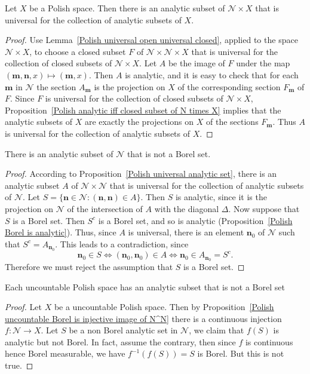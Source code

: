 \begin{proposition}\label{Polish universal analytic set}
Let $X$ be a Polish space. Then there is an analytic subset of $\mathscr{N}\times X$ that is universal for the collection of analytic subsets of $X$.
\end{proposition}
\begin{proof}
Use Lemma~\ref{Polish universal open universal closed}, applied to the space $\mathscr{N}\times X$, to choose a closed subset $F$ of $\mathscr{N}\times\mathscr{N}\times X$ that is universal for the collection of closed subsets of $\mathscr{N}\times X$. Let $A$ be the image of $F$ under the map $(\mathbf{m},\mathbf{n},x)\mapsto(\mathbf{m},x)$. Then $A$ is analytic, and it is easy to check that for each $\mathbf{m}$ in $\mathscr{N}$ the section $A_{\mathbf{m}}$ is the projection on $X$ of the corresponding section $F_{\mathbf{m}}$ of $F$. Since $F$ is universal for the collection of closed subsets of $\mathscr{N}\times X$, Proposition~\ref{Polish analytic iff closed subset of N times X} implies that the analytic subsets of $X$ are exactly the projections on $X$ of the sections $F_{\mathbf{m}}$. Thus $A$ is universal for the collection of analytic subsets of $X$.
\end{proof}
\begin{corollary}\label{analytic nonBorel in N^N}
There is an analytic subset of $\mathscr{N}$ that is not a Borel set.
\end{corollary}
\begin{proof}
According to Proposition~\ref{Polish universal analytic set}, there is an analytic subset $A$ of $\mathscr{N}\times\mathscr{N}$ that is universal for the collection of analytic subsets of $\mathscr{N}$. Let $S=\{\mathbf{n}\in\mathscr{N}:(\mathbf{n},\mathbf{n})\in A\}$. Then $S$ is analytic, since it is the projection on $\mathscr{N}$ of the intersection of $A$ with the diagonal $\Delta$. Now suppose that $S$ is a Borel set. Then $S^c$ is a Borel set, and so is analytic (Proposition~\ref{Polish Borel is analytic}). Thus, since $A$ is universal, there is an element $\mathbf{n}_0$ of $\mathscr{N}$ such that $S^c=A_{\mathbf{n}_0}$. This leads to a contradiction, since
\[\mathbf{n}_0\in S\iff(\mathbf{n}_0,\mathbf{n}_0)\in A\iff\mathbf{n}_0\in A_{\mathbf{n}_0}=S^c.\]
Therefore we must reject the assumption that $S$ is a Borel set.
\end{proof}
\begin{corollary}\label{Polish uncountable analytic nonBorel}
Each uncountable Polish space has an analytic subset that is not a Borel set
\end{corollary}
\begin{proof}
Let $X$ be a uncountable Polish space. Then by Proposition~\ref{Polish uncountable Borel is injective image of N^N} there is a continuous injection $f:\mathscr{N}\to X$. Let $S$ be a non Borel analytic set in $\mathscr{N}$, we claim that $f(S)$ is analytic but not Borel. In fact, assume the contrary, then since $f$ is continuous hence Borel measurable, we have $f^{-1}(f(S))=S$ is Borel. But this is not true.
\end{proof}
